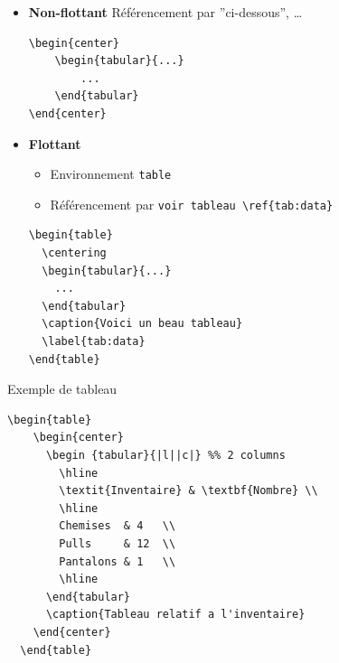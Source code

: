 \begin{frame}
\begin{itemize}
    \item \textbf{Non-flottant}
    Référencement par ''ci-dessous'', \dots
    \begin{lstlisting}[style=nonumbers]
\begin{center}
    \begin{tabular}{...}
        ...
    \end{tabular}
\end{center}
    \end{lstlisting}

    \item \textbf{Flottant}
      \begin{itemize}
        \item Environnement \lstinline|table|
        \item Référencement par \lstinline|voir tableau \ref{tab:data}|
      \end{itemize}
      \begin{lstlisting}
\begin{table}
  \centering
  \begin{tabular}{...}
    ...
  \end{tabular}
  \caption{Voici un beau tableau}
  \label{tab:data}
\end{table}
      \end{lstlisting}
  \end{itemize}
\end{frame}

\begin{frame}[fragile]{Exemple de tableau}
  \begin{footnotesize}
  \begin{lstlisting}[style=nonumbers]
  \begin{table}
    \begin{center}
      \begin {tabular}{|l||c|} %% 2 columns
        \hline
        \textit{Inventaire} & \textbf{Nombre} \\
        \hline
        Chemises  & 4   \\
        Pulls     & 12  \\
        Pantalons & 1   \\
        \hline
      \end{tabular}
      \caption{Tableau relatif a l'inventaire}
    \end{center}
  \end{table}
  \end{lstlisting}
  \end{footnotesize}
  \begin{center}
  \end{center}
\end{frame}

